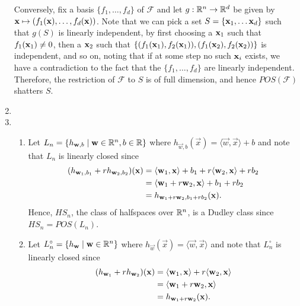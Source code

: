 \begin{ex}
\begin{enumerate}
          Conversely, fix a basis $\{f_1,\ldots,f_d\}$ of $\mathcal{F}$ and let
          $g:\mathbb{R}^n \to \mathbb{R}^d$ be given by $\mathbf{x}\mapsto (f_1(\mathbf{x}),\ldots,f_d(\mathbf{x}))$.
          Note that we can pick a set $S=\{\mathbf{x}_1,\ldots \mathbf{x}_d\}$ such
          that $g(S)$ is linearly independent, by first choosing a $\mathbf{x}_1$ such
          that $f_1(\mathbf{x}_1)\neq 0$, then a $\mathbf{x}_2$ such that
          $\{(f_1(\mathbf{x}_1), f_2(\mathbf{x}_1)), (f_1(\mathbf{x}_2), f_2(\mathbf{x}_2))\}$ is independent,
          and so on, noting that if at some step no such $\mathbf{x}_i$ exists, we have
          a contradiction to the fact that the $\{f_1, \ldots,f_d\}$ are
          linearly independent. Therefore, the restriction of $\mathcal{F}$
          to $S$ is of full dimension, and hence $POS(\mathcal{F})$ shatters
          $S$.
    \item
    \item[]
          \begin{enumerate}[1.]
            \item Let $L_n=\{h_{\mathbf{w},b} \mid \mathbf{w}\in\mathbb{R}^n, b\in \mathbb{R}\}$
                  where
                  $h_{\vec{w},b}(\vec{x}) =\langle\vec{w},\vec{x}\rangle + b$
                  and note that $L_n$ is linearly closed since
                  \begin{align*}
                    (h_{\mathbf{w}_1,b_1}+rh_{\mathbf{w}_2,b_2})(\mathbf{x})
                     & =\langle\mathbf{w}_1,\mathbf{x}\rangle + b_1
                    +r\langle\mathbf{w}_2,\mathbf{x}\rangle + rb_2        \\
                     & =\langle\mathbf{w}_1+r\mathbf{w}_2, \mathbf{x}\rangle
                    + b_1 + rb_2                               \\
                     & =h_{\mathbf{w}_1+r\mathbf{w}_2,b_1+rb_2}(\mathbf{x}).
                  \end{align*}
                  Hence, $HS_n$, the class of halfspaces over $\mathbb{R}^n$,
                  is a Dudley class since $HS_n=POS(L_n)$.
            \item Let $L^\circ_n=\{h_{\mathbf{w}} \mid \mathbf{w}\in\mathbb{R}^n \}$
                  where $h_{\vec{w}}(\vec{x})=\langle\vec{w},\vec{x}\rangle$
                  and note that $L^\circ_n$ is linearly closed since
                  \begin{align*}
                    (h_{\vec{w}_1}+rh_{\vec{w}_2})(\x)
                     & =\langle\vec{w}_1,\x\rangle
                    +r\langle\vec{w}_2,\x\rangle              \\
                     & =\langle\vec{w}_1+r\vec{w}_2,\x\rangle \\
                     & =h_{\vec{w}_1+r\vec{w}_2}(\x).

\end{align*}
\end{enumerate}
\end{enumerate}
\end{ex}
